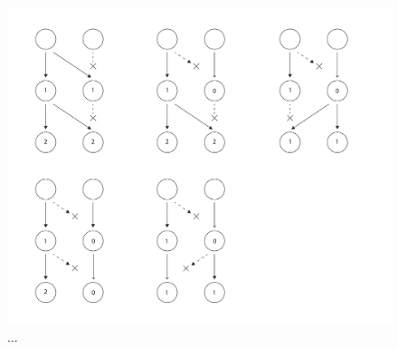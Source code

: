 \documentclass[pdftex,12pt,a4paper]{scrartcl}
\begin{document}
\begin{figure}[h]
    \centering
    \includegraphics[width=\textwidth]{SCBurdenDivisionRate.pdf}
    \caption{...}
    \label{fig:N2divisions}
\end{figure}
\end{document}
